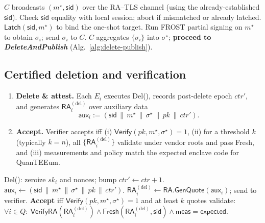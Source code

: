 \documentclass[runningheads,orivec]{llncs}
\newcommand{\prot}{\textsf{QuanTEEum}}
\newcommand{\RA}{\mathsf{RA}}
\newcommand{\FROST}{\textsf{FROST}}
\begin{document}
\begin{algorithm}[!htbp]
\caption{\prot{}: \emph{SingleSign} on designated message $m^{\star}$}
\label{alg:sign}
\begin{small}
\begin{algorithmic}[1]
\State $C$ broadcasts $(m^{\star},\mathsf{sid})$ over the RA–TLS channel (using the already-established $\mathsf{sid}$).
  \State Check $\mathsf{sid}$ equality with local session; abort if mismatched or already latched.
  \State $\textsf{Latch}(\mathsf{sid},m^{\star})$ to bind the one-shot target.
  \State Run \FROST{} partial signing on $m^{\star}$ to obtain $\sigma_i$; send $\sigma_i$ to $C$.
\EndFor
\State $C$ aggregates $\{\sigma_i\}$ into $\sigma^{\star}$; \textbf{proceed to \emph{DeleteAndPublish}} (Alg.~\ref{alg:delete-publish}).
\end{algorithmic}
\end{small}
\end{algorithm}

\subsection{Certified deletion and verification}\label{sec:verify}
\begin{enumerate}
  \item \textbf{Delete \& attest.} Each $E_i$ executes \textsf{Del}(), records post-delete epoch $ctr'$, and generates $\RA_i^{(\mathrm{del})}$ over auxiliary data
  \[
    \textsf{aux}_i := (\mathsf{sid}\,\|\,m^{\star}\,\|\,\sigma^{\star}\,\|\,pk\,\|\,ctr').
  \]
  \item \textbf{Accept.} Verifier accepts iff (i) $\mathsf{Verify}(pk,m^{\star},\sigma^{\star})=1$, (ii) for a threshold $k$ (typically $k{=}n$), all $\{\RA_i^{(\mathrm{del})}\}$ validate under vendor roots and pass \textsf{Fresh}, and (iii) measurements and policy match the expected enclave code for \prot{}.
\end{enumerate}

\begin{algorithm}[!htbp]
\caption{\prot{}: \emph{DeleteAndVerify}}
\label{alg:delete-verify}
\begin{small}
\begin{algorithmic}[1]
  \State \textsf{Del}(): zeroize $sk_i$ and nonces; bump $ctr' \leftarrow ctr{+}1$.
  \State $\textsf{aux}_i \gets (\mathsf{sid}\,\|\,m^{\star}\,\|\,\sigma^{\star}\,\|\,pk\,\|\,ctr')$.
  \State $\RA_i^{(\mathrm{del})} \gets \textsf{RA.GenQuote}(\textsf{aux}_i)$; send to verifier.
\EndFor
\State \textbf{Accept} iff $\mathsf{Verify}(pk,m^{\star},\sigma^{\star})=1$ and at least $k$ quotes validate:
\State \hspace{1.2em}$\forall i\in Q:\ \textsf{VerifyRA}(\RA_i^{(\mathrm{del})})\wedge \textsf{Fresh}(\RA_i^{(\mathrm{del})},\mathsf{sid})\wedge \mathsf{meas}{=}\mathsf{expected}$.
\end{algorithmic}
\end{small}
\end{algorithm}
\end{document}

